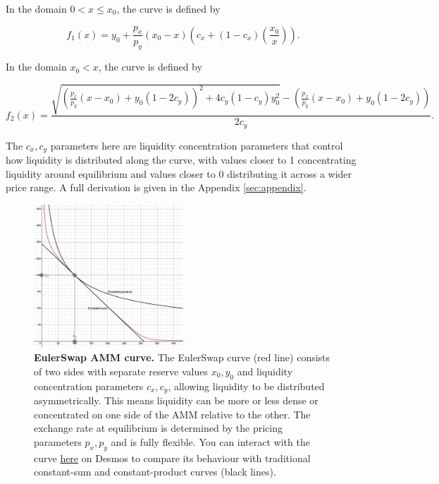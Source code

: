 \documentclass{article}
\begin{document}
In the domain $0 < x \leq x_0$, the curve is defined by

\begin{equation}
    \label{eq:fx1-main}
    f_1(x) 
    =
    y_{0}+\frac{p_{x}}{p_{y}}\left(x_{0}-x\right)\left(c_{x}+\left(1-c_{x}\right)\left(\frac{x_{0}}{x}\right)\right).
\end{equation}

In the domain $x_0 < x$, the curve is defined by

\begin{equation}
    \label{eq:fx2-main}
    f_2(x) 
    =
    \frac{
        \sqrt{
            \left( \frac{p_x}{p_y} (x - x_0) + y_0 (1 - 2c_y) \right)^2 
            + 4c_y (1 - c_y) y_0^2
        } 
        - \left( \frac{p_x}{p_y} (x - x_0) + y_0 (1 - 2c_y) \right)
    }{2c_y}.
\end{equation}

 The $c_x, c_y$ parameters here are liquidity concentration parameters that control how liquidity is distributed along the curve, with values closer to 1 concentrating liquidity around equilibrium and values closer to 0 distributing it across a wider price range. A full derivation is given in the Appendix \ref{sec:appendix}.  
 
 \begin{figure}[h]  %
    \centering  %
    \includegraphics[width=0.5\textwidth]{curve.png} %
    \caption{\textbf{EulerSwap AMM curve.} The EulerSwap curve (red line) consists of two sides with separate reserve values $x_0, y_0$ and liquidity concentration parameters $c_x, c_y$, allowing liquidity to be distributed asymmetrically. This means liquidity can be more or less dense or concentrated on one side of the AMM relative to the other. The exchange rate at equilibrium is determined by the pricing parameters $p_x, p_y$ and is fully flexible. You can interact with the curve \href{https://www.desmos.com/calculator/gzwmvbs1dk}{here} on Desmos to compare its behaviour with traditional constant-sum and constant-product curves (black lines).}
    \label{fig:fig1}  %
\end{figure}
\end{document}
